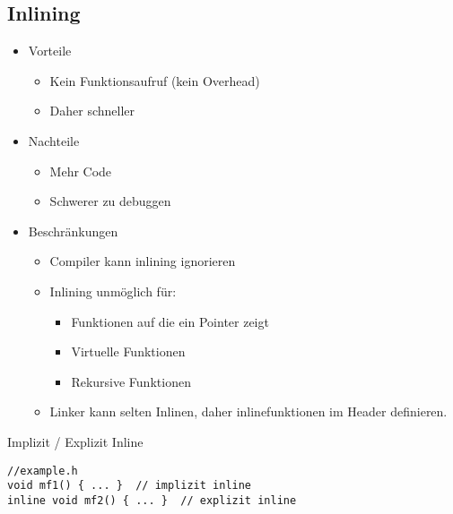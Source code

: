 \subsection{Inlining}
\begin{itemize}
	\item Vorteile
		\begin{itemize}
			\item Kein Funktionsaufruf (kein Overhead)
			\item Daher schneller
		\end{itemize}
	\item Nachteile
		\begin{itemize}
			\item Mehr Code
			\item Schwerer zu debuggen
		\end{itemize}
	\item Beschränkungen
		\begin{itemize}
			\item Compiler kann inlining ignorieren
			\item Inlining unmöglich für:
				\begin{itemize}
					\item Funktionen auf die ein Pointer zeigt
					\item Virtuelle Funktionen
					\item Rekursive Funktionen
				\end{itemize}
			\item Linker kann selten Inlinen, daher inlinefunktionen im Header definieren.

		\end{itemize}
\end{itemize}
Implizit / Explizit Inline
\begin{lstlisting}
//example.h
void mf1() { ... }  // implizit inline
inline void mf2() { ... }  // explizit inline
\end{lstlisting}

